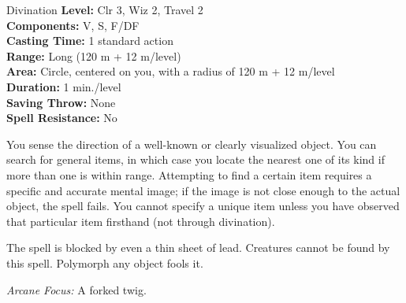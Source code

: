{Divination}
{
	\textbf{Level:}
	Clr 3, Wiz 2, Travel 2\\
	\textbf{Components:}
	V, S, F/DF\\
	\textbf{Casting Time:}
	1 standard action\\
	\textbf{Range:}
	Long (120 m + 12 m/level)\\
	\textbf{Area:}
	Circle, centered on you, with a radius of 120 m + 12 m/level\\
	\textbf{Duration:}
	1 min./level\\
	\textbf{Saving Throw:}
	None\\
	\textbf{Spell Resistance:}
	No\\
}
{
	You sense the direction of a well-known or clearly visualized object. You can search for general items, in which case you locate the nearest one of its kind if more than one is within range. Attempting to find a certain item requires a specific and accurate mental image; if the image is not close enough to the actual object, the spell fails. You cannot specify a unique item unless you have observed that particular item firsthand (not through divination).

	The spell is blocked by even a thin sheet of lead. Creatures cannot be found by this spell. Polymorph any object fools it.

	\textit{Arcane Focus:}
	A forked twig.

}
